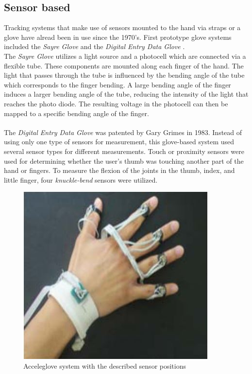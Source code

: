 \subsection{Sensor based}
\label{Sensor based}
Tracking systems that make use of sensors mounted to the hand via straps or a glove have alread been in use since the 1970's. First prototype glove systems included the \textit{Sayre Glove} \cite{ThomasA.DeFanti.1977} and the \textit{Digital Entry Data Glove} \cite{Grimes.1983}.\\
The \textit{Sayre Glove} utilizes a light source and a photocell which are connected via a flexible tube. These components are mounted along each finger of the hand. The light that passes through the tube is influenced by the bending angle of the tube which corresponds to the finger bending. A large bending angle of the finger induces a larger bending angle of the tube, reducing the intensity of the light that reaches the photo diode. The resulting voltage in the photocell can then be mapped to a specific bending angle of the finger.\\\\The \textit{Digital Entry Data Glove} was patented by Gary Grimes in 1983. Instead of using only one type of sensors for measurement, this glove-based system used several sensor types for different measurements.
Touch or proximity sensors were used for determining whether the user's thumb was touching another part of the hand or fingers. To measure the flexion of the joints in the thumb, index, and little finger, four \textit{knuckle-bend} sensors were utilized.
\begin{figure}
\label{acceleglove}
\includegraphics[scale=0.5]{images/acceleglove.JPG} 
\caption{Acceleglove system with the described sensor positions \cite{HernandezRebollar.2002}}
\end{figure}
